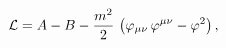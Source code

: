 \begin{equation}
{\cal L}=A-B-\frac{m^{2}}{2}\,\left(\varphi _{\mu \nu }\, \varphi ^{\mu
\nu}-\varphi ^{2}\right),  \label{x055}
\end{equation}


